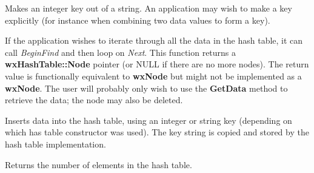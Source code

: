 
Makes an integer key out of a string. An application may wish to make a key
explicitly (for instance when combining two data values to form a key).

\label{wxhashtablenext}


If the application wishes to iterate through all the data in the hash
table, it can call {\it BeginFind} and then loop on {\it Next}. This function
returns a {\bf wxHashTable::Node} pointer (or NULL if there are no more nodes).
The return value is functionally equivalent to \textbf{wxNode} but might not be
implemented as a \textbf{wxNode}. The user will probably only wish to use the
\textbf{GetData} method to retrieve the data; the node may also be deleted.

\label{wxhashtableput}



Inserts data into the hash table, using an integer or string key (depending on which
has table constructor was used). The key string is copied and stored by the hash
table implementation.

\label{wxhashtablegetcount}


Returns the number of elements in the hash table.

